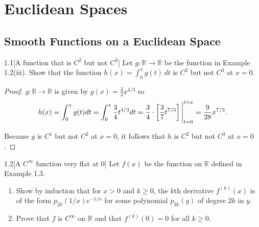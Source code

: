 \chapter{Euclidean Spaces}

\section{Smooth Functions on a Euclidean Space}

\begin{problem}{1.1}[A function that is \(C^{2}\) but not \(C^{3}\)]
Let \(g\colon\mathbb{R}\to\mathbb{R}\) be the function in Example 1.2(iii). Show that the function \(h(x)=\int_{0}^{x}g(t)\,dt\) is \(C^{2}\) but not \(C^{3}\) at \(x=0\).
\end{problem}

\begin{proof}
	\( g: \mathbb{R} \to \mathbb{R} \) is given by \( g(x) = \frac{3}{4}x^{4/3} \) so
	\[
		h(x) = \int^{x}_{0} g(t) dt = \int^{x}_{0} \frac{3}{4}t^{4/3} dt = \frac{3}{4}\cdot \left[\frac{3}{7} t^{7/3}\right]\Bigg{\vert}^{t=x}_{t=0} = \frac{9}{28} x^{7/3}.
	\]

	Because \( g \) is \( C^{1} \) but not \( C^{2} \) at \( x = 0 \), it follows that \( h \) is \( C^{2} \) but not \( C^{3} \) at \( x = 0 \).
\end{proof}

\begin{problem}{1.2}[A \(C^{\infty}\) function very flat at \(0\)]
Let \(f(x)\) be the function on \(\mathbb{R}\) defined in Example 1.3.
\begin{enumerate}[label={(\alph*)}]
	\item Show by induction that for \(x>0\) and \(k\geq 0\), the \(k\)th derivative \(f^{(k)}(x)\) is of the form \(p_{2k}(1/x)e^{-1/x}\) for some polynomial \(p_{2k}(y)\) of degree \(2k\) in \(y\).
	\item Prove that \(f\) is \(C^{\infty}\) on \(\mathbb{R}\) and that \(f^{(k)}(0)=0\) for all \(k\geq 0\).
\end{enumerate}
\end{problem}

